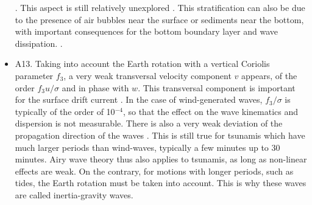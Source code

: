 \begin{itemize}
\citep{Thorpe1966}. This aspect is still relatively unexplored  \citep{Osborne&Burch1980,Kudryavtsev1994}. This stratification can also be due to the 
presence of air bubbles near the surface or sediments near the bottom, with important consequences for the bottom boundary layer and wave dissipation. 
\citep[e.g.][]{Winterwerp2007,Styles&Glenn2000}.\vspace{0.3cm}
\item A13. Taking into account the Earth rotation with a vertical Coriolis parameter $f_3$, a very weak transversal velocity component $v$ appears, 
of the order  $f_3 u /\sigma$ and in phase with $w$.  This transversal component is important for the surface drift current
 \citep{Hasselmann1970,Xu&Bowen1994,Ardhuin&al.2004b,Rascle&Ardhuin2009}. In the case of wind-generated waves, 
  $f_3/\sigma$ is typically of the order of 10$^{-4}$, so that the effect on the wave kinematics and dispersion is not measurable. 
There is also a very weak deviation of the propagation direction of the waves \citep{Backus1962}. This is still true for tsunamis 
which have much larger periods than wind-waves, typically a few minutes up to 30 minutes. Airy wave theory thus also applies to tsunamis, as long as non-linear effects are 
weak. On the contrary, for motions with longer periods, such as tides, the Earth rotation must be taken into account. This is why these waves are called inertia-gravity waves. 
\end{itemize}


